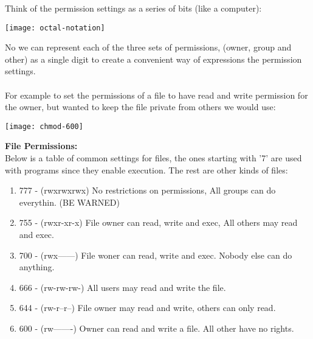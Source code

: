\documentclass[12pt, letterpaper]{report}
\begin{document}
Think of the permission settings as a series of bits (like a computer):
\begin{center}
\texttt{[image: octal-notation]}
\end{center}
No we can represent each of the three sets of permissions, (owner, group and other)
as a single digit to create a convenient way of expressions the permission settings.\\\\

For example to set the permissions of a file to have read and write permission for the owner,
but wanted to keep the file private from others we would use:\\
\begin{center}
\texttt{[image: chmod-600]}
\end{center}

\clearpage
\textbf{File Permissions:}\\
Below is a table of common settings for files, the ones starting with '7' are used with programs
since they enable execution. The rest are other kinds of files:
\begin{enumerate}
	\item 777 - (rwxrwxrwx) No restrictions on permissions, All groups can do everythin. (BE WARNED)
	\item 755 - (rwxr-xr-x) File owner can read, write and exec, All others may read and exec.
	\item 700 - (rwx------) File woner can read, write and exec. Nobody else can do anything.
	\item 666 - (rw-rw-rw-) All users may read and write the file.
	\item 644 - (rw-r--r--) File owner may read and write, others can only read.
	\item 600 - (rw-------) Owner can read and write a file. All other have no rights.
\end{enumerate}
\end{document}
